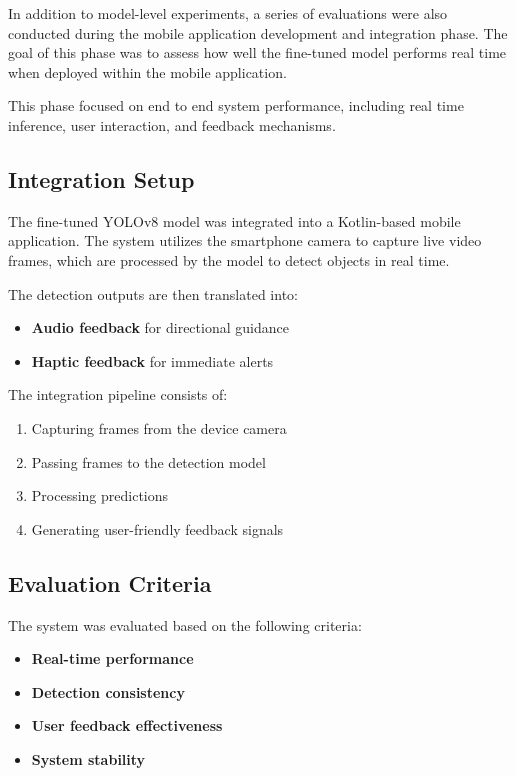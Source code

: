 \documentclass{FastFyp}
\begin{document}
In addition to model-level experiments, a series of evaluations were also conducted during the mobile application development and integration phase. The goal of this phase was to assess how well the fine-tuned model performs real time when deployed within the mobile application.

This phase focused on end to end system performance, including real time inference, user interaction, and feedback mechanisms.

\subsection{Integration Setup}

The fine-tuned YOLOv8 model was integrated into a Kotlin-based mobile application. The system utilizes the smartphone camera to capture live video frames, which are processed by the model to detect objects in real time.

The detection outputs are then translated into:

\begin{itemize}
    \item \textbf{Audio feedback} for directional guidance
    \item \textbf{Haptic feedback} for immediate alerts
\end{itemize}

The integration pipeline consists of:
\begin{enumerate}
    \item Capturing frames from the device camera
    \item Passing frames to the detection model
    \item Processing predictions
    \item Generating user-friendly feedback signals
\end{enumerate}

\subsection{Evaluation Criteria}

The system was evaluated based on the following criteria:

\begin{itemize}
    \item \textbf{Real-time performance} 
    \item \textbf{Detection consistency} 
    \item \textbf{User feedback effectiveness}
    \item \textbf{System stability}
\end{itemize}
\end{document}
